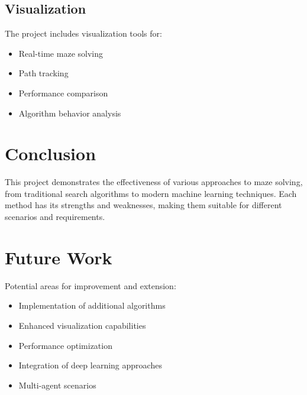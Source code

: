 \documentclass[12pt,a4paper]{article}
\begin{document}
\subsection{Visualization}
The project includes visualization tools for:

\begin{itemize}
    \item Real-time maze solving
    \item Path tracking
    \item Performance comparison
    \item Algorithm behavior analysis
\end{itemize}

\section{Conclusion}
This project demonstrates the effectiveness of various approaches to maze solving, from traditional search algorithms to modern machine learning techniques. Each method has its strengths and weaknesses, making them suitable for different scenarios and requirements.

\section{Future Work}
Potential areas for improvement and extension:

\begin{itemize}
    \item Implementation of additional algorithms
    \item Enhanced visualization capabilities
    \item Performance optimization
    \item Integration of deep learning approaches
    \item Multi-agent scenarios
\end{itemize}
\end{document}
